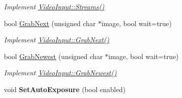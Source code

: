 \begin{DoxyCompactItemize}
\begin{DoxyCompactList}\small\item\em Implement \hyperlink{structpangolin_1_1_video_input_a9030d775d699c39ab7b7ba378c007c6a}{Video\+Input\+::\+Streams()} \end{DoxyCompactList}\item 
bool \hyperlink{structpangolin_1_1_open_ni_video_aa83894708b9410b457b9dcf5a4e05b5e}{Grab\+Next} (unsigned char $\ast$image, bool wait=true)\hypertarget{structpangolin_1_1_open_ni_video_aa83894708b9410b457b9dcf5a4e05b5e}{}\label{structpangolin_1_1_open_ni_video_aa83894708b9410b457b9dcf5a4e05b5e}

\begin{DoxyCompactList}\small\item\em Implement \hyperlink{structpangolin_1_1_video_input_ad3d8ff59c1ec4139320097e6e1111f32}{Video\+Input\+::\+Grab\+Next()} \end{DoxyCompactList}\item 
bool \hyperlink{structpangolin_1_1_open_ni_video_af98e477d47faffc3ca5389acb1d7f1ca}{Grab\+Newest} (unsigned char $\ast$image, bool wait=true)\hypertarget{structpangolin_1_1_open_ni_video_af98e477d47faffc3ca5389acb1d7f1ca}{}\label{structpangolin_1_1_open_ni_video_af98e477d47faffc3ca5389acb1d7f1ca}

\begin{DoxyCompactList}\small\item\em Implement \hyperlink{structpangolin_1_1_video_input_a4c8ac38e3c6a3f591663aeebf645e4c6}{Video\+Input\+::\+Grab\+Newest()} \end{DoxyCompactList}\item 
void {\bfseries Set\+Auto\+Exposure} (bool enabled)\hypertarget{structpangolin_1_1_open_ni_video_a2ee4009ea3058beecc11a1da11652fc8}{}\label{structpangolin_1_1_open_ni_video_a2ee4009ea3058beecc11a1da11652fc8}

\end{DoxyCompactItemize}
